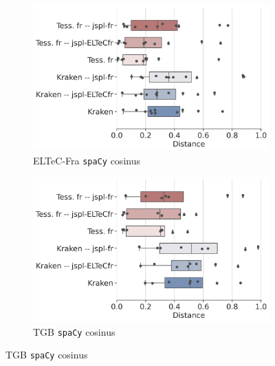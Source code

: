 \begin{figure}[h!]

    \begin{subfigure}{0.45\textwidth}
  \includegraphics[height=.65\textwidth]{IMAGES/Boite-moustache/ELTeC-Fra_spacy3.5.1_cosinus.png} 
        \caption{ELTeC-Fra \texttt{spaCy} cosinus}
   \end{subfigure}
        \begin{subfigure}{0.5\textwidth}
  \includegraphics[height=.65\textwidth]{IMAGES/Boite-moustache/TGB_spaCy3.5.1_cosinus.png} 
        \caption{TGB \texttt{spaCy} cosinus}
   \end{subfigure}
   

\end{figure}

